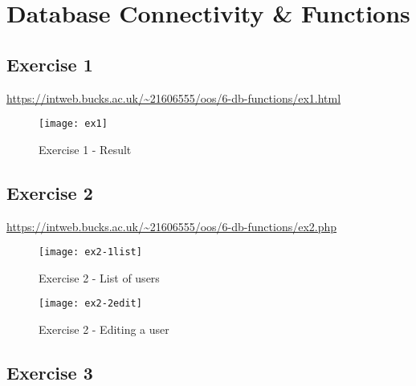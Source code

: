 \chapter{Database Connectivity \& Functions}
\graphicspath{{6-db-functions/images/}}

\section{Exercise 1}

\url{https://intweb.bucks.ac.uk/~21606555/oos/6-db-functions/ex1.html}

\captionsetup{type=figure}


\clearpage
\captionsetup{type=figure}


\begin{figure}[H]
  \caption{Exercise 1 - Result}
  \centering
  \texttt{[image: ex1]}
\end{figure}

\clearpage
\section{Exercise 2}

\url{https://intweb.bucks.ac.uk/~21606555/oos/6-db-functions/ex2.php}

\captionsetup{type=figure}


\clearpage
\captionsetup{type=figure}


\begin{figure}[H]
  \caption{Exercise 2 - List of users}
  \centering
  \texttt{[image: ex2-1list]}
\end{figure}

\begin{figure}[H]
  \caption{Exercise 2 - Editing a user}
  \centering
  \texttt{[image: ex2-2edit]}
\end{figure}

\clearpage
\section{Exercise 3}

\captionsetup{type=figure}


